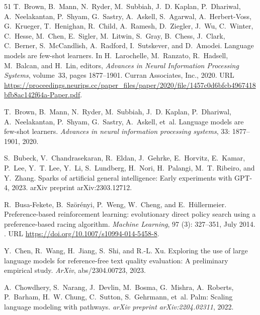 \begin{thebibliography}{51}
T.~Brown, B.~Mann, N.~Ryder, M.~Subbiah, J.~D. Kaplan, P.~Dhariwal,
  A.~Neelakantan, P.~Shyam, G.~Sastry, A.~Askell, S.~Agarwal, A.~Herbert-Voss,
  G.~Krueger, T.~Henighan, R.~Child, A.~Ramesh, D.~Ziegler, J.~Wu, C.~Winter,
  C.~Hesse, M.~Chen, E.~Sigler, M.~Litwin, S.~Gray, B.~Chess, J.~Clark,
  C.~Berner, S.~McCandlish, A.~Radford, I.~Sutskever, and D.~Amodei.
\newblock Language models are few-shot learners.
\newblock In H.~Larochelle, M.~Ranzato, R.~Hadsell, M.~Balcan, and H.~Lin,
  editors, \emph{Advances in Neural Information Processing Systems}, volume~33,
  pages 1877--1901. Curran Associates, Inc., 2020{}.
\newblock URL
  \url{https://proceedings.neurips.cc/paper_files/paper/2020/file/1457c0d6bfcb4967418bfb8ac142f64a-Paper.pdf}.

T.~Brown, B.~Mann, N.~Ryder, M.~Subbiah, J.~D. Kaplan, P.~Dhariwal,
  A.~Neelakantan, P.~Shyam, G.~Sastry, A.~Askell, et~al.
\newblock Language models are few-shot learners.
\newblock \emph{Advances in neural information processing systems},
  33: 1877--1901, 2020{}.

S.~Bubeck, V.~Chandrasekaran, R.~Eldan, J.~Gehrke, E.~Horvitz, E.~Kamar,
  P.~Lee, Y.~T. Lee, Y.~Li, S.~Lundberg, H.~Nori, H.~Palangi, M.~T. Ribeiro,
  and Y.~Zhang.
\newblock Sparks of artificial general intelligence: Early experiments with
  {GPT}-4, 2023.
\newblock arXiv preprint arXiv:2303.12712.

R.~Busa-Fekete, B.~Sz\"{o}r{\'{e}}nyi, P.~Weng, W.~Cheng, and
  E.~H\"{u}llermeier.
\newblock Preference-based reinforcement learning: evolutionary direct policy
  search using a preference-based racing algorithm.
\newblock \emph{Machine Learning}, 97 (3): 327--351, July
  2014.
\newblock {}.
\newblock URL \url{https://doi.org/10.1007/s10994-014-5458-8}.

Y.~Chen, R.~Wang, H.~Jiang, S.~Shi, and R.-L. Xu.
\newblock Exploring the use of large language models for reference-free text
  quality evaluation: A preliminary empirical study.
\newblock \emph{ArXiv}, abs/2304.00723, 2023.

A.~Chowdhery, S.~Narang, J.~Devlin, M.~Bosma, G.~Mishra, A.~Roberts, P.~Barham,
  H.~W. Chung, C.~Sutton, S.~Gehrmann, et~al.
\newblock Palm: Scaling language modeling with pathways.
\newblock \emph{arXiv preprint arXiv:2204.02311}, 2022.


\end{thebibliography}
